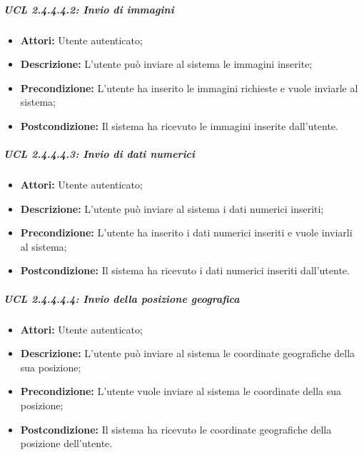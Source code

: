\subparagraph{UCL 2.4.4.4.2: Invio di immagini}
\begin{itemize}
\item \textbf{Attori:} Utente autenticato;
\item \textbf{Descrizione:} L'utente può inviare al sistema le immagini inserite;
\item \textbf{Precondizione:} L'utente ha inserito le immagini richieste e vuole inviarle al sistema;
\item \textbf{Postcondizione:} Il sistema ha ricevuto le immagini inserite dall'utente.
\end{itemize}

\subparagraph{UCL 2.4.4.4.3: Invio di dati numerici}
\begin{itemize}
\item \textbf{Attori:} Utente autenticato;
\item \textbf{Descrizione:} L'utente può inviare al sistema i dati numerici inseriti;
\item \textbf{Precondizione:} L'utente ha inserito i dati numerici inseriti e vuole inviarli al sistema;
\item \textbf{Postcondizione:} Il sistema ha ricevuto i dati numerici inseriti dall'utente.
\end{itemize}

\subparagraph{UCL 2.4.4.4.4: Invio della posizione geografica}
\begin{itemize}
\item \textbf{Attori:} Utente autenticato;
\item \textbf{Descrizione:} L'utente può inviare al sistema le coordinate geografiche della sua posizione;
\item \textbf{Precondizione:} L'utente vuole inviare al sistema le coordinate della sua posizione;
\item \textbf{Postcondizione:} Il sistema ha ricevuto le coordinate geografiche della posizione dell'utente.
\end{itemize}

